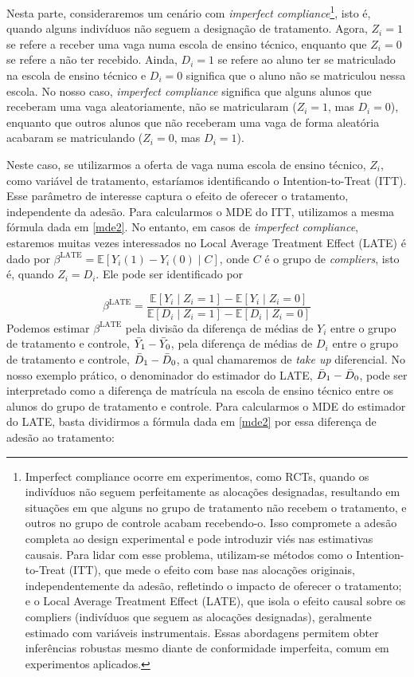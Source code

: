 Nesta parte, consideraremos um cenário com \textit{imperfect compliance}\footnote{Imperfect compliance ocorre em experimentos, como RCTs, quando os indivíduos não seguem perfeitamente as alocações designadas, resultando em situações em que alguns no grupo de tratamento não recebem o tratamento, e outros no grupo de controle acabam recebendo-o. Isso compromete a adesão completa ao design experimental e pode introduzir viés nas estimativas causais. Para lidar com esse problema, utilizam-se métodos como o Intention-to-Treat (ITT), que mede o efeito com base nas alocações originais, independentemente da adesão, refletindo o impacto de oferecer o tratamento; e o Local Average Treatment Effect (LATE), que isola o efeito causal sobre os compliers (indivíduos que seguem as alocações designadas), geralmente estimado com variáveis instrumentais. Essas abordagens permitem obter inferências robustas mesmo diante de conformidade imperfeita, comum em experimentos aplicados.}, isto é, quando alguns indivíduos não seguem a designação de tratamento. Agora, $Z_i = 1$ se refere a receber uma vaga numa escola de ensino técnico, enquanto que $Z_i = 0$ se refere a não ter recebido. Ainda, $D_i = 1$ se refere ao aluno ter se matriculado na escola de ensino técnico e $D_i = 0$ significa que o aluno não se matriculou nessa escola.  No nosso caso, \textit{imperfect compliance} significa que alguns alunos que receberam uma vaga aleatoriamente, não se matricularam ($Z_i =1$, mas $D_i = 0$), enquanto que outros alunos que não receberam uma vaga de forma aleatória acabaram se matriculando ($Z_i = 0$, mas $D_i = 1$).

Neste caso, se utilizarmos a oferta de vaga numa escola de ensino técnico, $Z_i$, como variável de tratamento, estaríamos identificando o Intention-to-Treat (ITT). Esse parâmetro de interesse captura o efeito de oferecer o tratamento, independente da adesão. Para calcularmos o MDE do ITT, utilizamos a mesma fórmula dada em \ref{mde2}. No entanto, em casos de \textit{imperfect compliance}, estaremos muitas vezes interessados no Local Average Treatment Effect (LATE) é dado por $\beta^{\text{LATE}} = \mathbb{E}[Y_i(1) - Y_i(0) \mid C]$, onde $C$ é o grupo de \textit{compliers}, isto é, quando $Z_i = D_i$. Ele pode ser identificado por

    $$
    \beta^{\text{LATE}} = \frac{\mathbb{E}[Y_i \mid Z_i = 1] - \mathbb{E}[Y_i \mid Z_i = 0]}{\mathbb{E}[D_i \mid Z_i = 1] - \mathbb{E}[D_i \mid Z_i = 0]}
    $$
Podemos estimar $\beta^{\text{LATE}}$ pela divisão da diferença de médias de $Y_i$ entre o grupo de tratamento e controle, $\Bar{Y}_1 - \Bar{Y}_0$, pela diferença de médias de $D_i$ entre o grupo de tratamento e controle, $\Bar{D}_1 - \Bar{D}_0$, a qual chamaremos de \textit{take up} diferencial. No nosso exemplo prático, o denominador do estimador do LATE, $\Bar{D}_1 - \Bar{D}_0$, pode ser interpretado como a diferença de matrícula na escola de ensino técnico entre os alunos do grupo de tratamento e controle. Para calcularmos o MDE do estimador do LATE, basta dividirmos a fórmula dada em \ref{mde2} por essa diferença de adesão ao tratamento:

